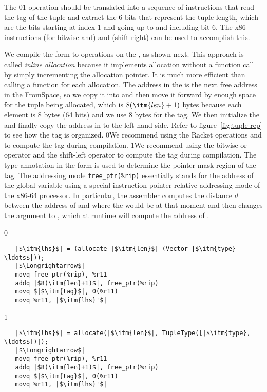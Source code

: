 \documentclass[7x10]{TimesAPriori_MIT}%
\def\racketEd{0}
\def\pythonEd{1}
\def\edition{1}
\newcommand{\racket}[1]{{\if\edition\racketEd{#1}\fi}}
\newcommand{\pythonColor}[0]{}
\newcommand{\python}[1]{{\if\edition\pythonEd\pythonColor #1\fi}}
\numberwithin{theorem}{chapter}
\numberwithin{definition}{chapter}
\numberwithin{equation}{chapter}
\begin{document}
The \racket{}\python{} operation should
be translated into a sequence of instructions that read the tag of the
tuple and extract the 6 bits that represent the tuple length, which
are the bits starting at index 1 and going up to and including bit 6.
The x86 instructions  (for bitwise-and) and 
(shift right) can be used to accomplish this.

We compile the  form to operations on the
, as shown next.  This approach is called
\emph{inline allocation} because it implements allocation without a
function call by simply incrementing the allocation pointer. It is much
more efficient than calling a function for each allocation. The
address in the  is the next free address in the
FromSpace, so we copy it into  and then move it forward by
enough space for the tuple being allocated, which is $8(\itm{len}+1)$
bytes because each element is 8 bytes (64 bits) and we use 8 bytes for
the tag.  We then initialize the  and finally copy the
address in  to the left-hand side. Refer to
figure~\ref{fig:tuple-rep} to see how the tag is organized.
%
\racket{We recommend using the Racket operations
\code{bitwise-ior} and \code{arithmetic-shift} to compute the tag
during compilation.}
%
\python{We recommend using the bitwise-or operator \code{|} and the
  shift-left operator \code{<<} to compute the tag during
  compilation.}
%
The type annotation in the  form is used to determine
the pointer mask region of the tag.
%
The addressing mode \verb!free_ptr(%rip)! essentially stands for the
address of the  global variable using a special
instruction-pointer-relative addressing mode of the x86-64 processor.
In particular, the assembler computes the distance $d$ between the
address of  and where the  would be at that
moment and then changes the  argument to
, which at runtime will compute the address of
.
%
{\if\edition\racketEd
\begin{lstlisting}
   |$\itm{lhs}$| = (allocate |$\itm{len}$| (Vector |$\itm{type} \ldots$|));
   |$\Longrightarrow$|
   movq free_ptr(%rip), %r11
   addq |$8(\itm{len}+1)$|, free_ptr(%rip)
   movq $|$\itm{tag}$|, 0(%r11)
   movq %r11, |$\itm{lhs}'$|
\end{lstlisting}
\fi}
{\if\edition\pythonEd\pythonColor    
\begin{lstlisting}
   |$\itm{lhs}$| = allocate(|$\itm{len}$|, TupleType([|$\itm{type}, \ldots$])|);
   |$\Longrightarrow$|
   movq free_ptr(%rip), %r11
   addq |$8(\itm{len}+1)$|, free_ptr(%rip)
   movq $|$\itm{tag}$|, 0(%r11)
   movq %r11, |$\itm{lhs}'$|
\end{lstlisting}
\fi}
\end{document}
